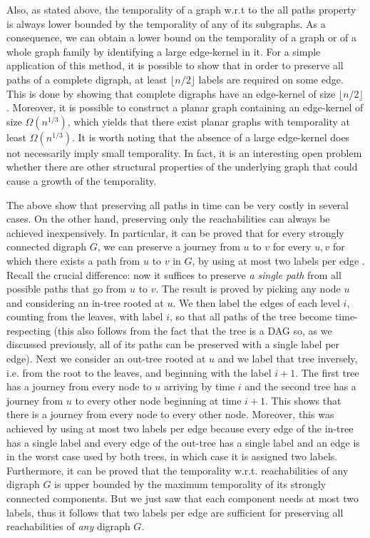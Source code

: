 \documentclass[oribibl, 11pt]{llncs}
\begin{document}
Also, as stated above, the temporality of a graph w.r.t to the all paths property is always lower bounded by the temporality of any of its subgraphs. As a consequence, we can obtain a lower bound on the temporality of a graph or of a whole graph family by identifying a large edge-kernel in it. For a simple application of this method, it is possible to show that in order to preserve all paths of a complete digraph, at least $\lfloor n/2\rfloor$ labels are required on some edge. This is done by showing that complete digraphs have an edge-kernel of size $\lfloor n/2\rfloor$. Moreover, it is possible to construct a planar graph containing an edge-kernel of size $\Omega(n^{1/3})$, which yields that there exist planar graphs with temporality at least $\Omega(n^{1/3})$. It is worth noting that the absence of a large edge-kernel does not necessarily imply small temporality. In fact, it is an interesting open problem whether there are other structural properties of the underlying graph that could cause a growth of the temporality.

The above show that preserving all paths in time can be very costly in several cases. On the other hand, preserving  only the reachabilities can always be achieved inexpensively. In particular, it can be proved that for every strongly connected digraph $G$, we can preserve a journey from $u$ to $v$ for every $u,v$ for which there exists a path from $u$ to $v$ in $G$, by using at most two labels per edge \cite{MMCS13}. Recall the crucial difference: now it suffices to preserve \emph{a single path} from all possible paths that go from $u$ to $v$. The result is proved by picking any node $u$ and considering an in-tree rooted at $u$. We then label the edges of each level $i$, counting from the leaves, with label $i$, so that all paths of the tree become time-respecting (this also follows from the fact that the tree is a DAG so, as we discussed previously, all of its paths can be preserved with a single label per edge). Next we consider an out-tree rooted at $u$ and we label that tree inversely, i.e. from the root to the leaves, and beginning with the label $i+1$. The first tree has a journey from every node to $u$ arriving by time $i$ and the second tree has a journey from $u$ to every other node beginning at time $i+1$. This shows that there is a journey from every node to every other node. Moreover, this was achieved by using at most two labels per edge because every edge of the in-tree has a single label and every edge of the out-tree has a single label and an edge is in the worst case used by both trees, in which case it is assigned two labels. Furthermore, it can be proved that the temporality w.r.t. reachabilities of any digraph $G$ is upper bounded by the maximum temporality of its strongly connected components. But we just saw that each component needs at most two labels, thus it follows that two labels per edge are sufficient for preserving all reachabilities of \emph{any} digraph $G$. 
\end{document}
